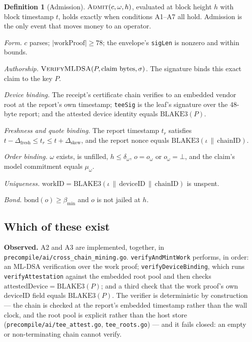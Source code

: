 \documentclass[11pt,a4paper]{article}
\theoremstyle{definition}
\newtheorem{definition}{Definition}[section]
\theoremstyle{remark}
\newcommand{\code}[1]{\texttt{#1}}
\newcommand{\Ord}{\omega}
\newcommand{\Claim}{c}
\newcommand{\Admit}{\textsc{Admit}}
\begin{document}
\begin{definition}[Admission]
$\Admit(\Claim, \Ord, h)$, evaluated at block height $h$ with block timestamp
$t$, holds exactly when conditions A1--A7 all hold. Admission is the only
event that moves money to an operator.
\end{definition}

\begin{description}[leftmargin=2.6em,style=sameline,labelwidth=2.2em]
\item[A1] \emph{Form.} $\Claim$ parses; $|\text{workProof}| \ge 78$; the
envelope's \code{sigLen} is nonzero and within bounds.
\item[A2] \emph{Authorship.} $\textsc{VerifyMLDSA}(P, \text{claim bytes}, \sigma)$.
The signature binds this exact claim to the key $P$.
\item[A3] \emph{Device binding.} The receipt's certificate chain verifies to an
embedded vendor root at the report's own timestamp; \code{teeSig} is the leaf's
signature over the 48-byte report; and the attested device identity equals
$\mathrm{BLAKE3}(P)$.
\item[A4] \emph{Freshness and quote binding.} The report timestamp $t_r$
satisfies $t - \Delta_{\text{fresh}} \le t_r \le t + \Delta_{\text{skew}}$, and
the report nonce equals $\mathrm{BLAKE3}(\iota \,\|\, \text{chainID})$.
\item[A5] \emph{Order binding.} $\Ord$ exists, is unfilled, $h \le \delta_\Ord$,
$o = o_\Ord$ or $o_\Ord = \bot$, and the claim's model commitment equals
$\mu_\Ord$.
\item[A6] \emph{Uniqueness.} $\mathrm{workID} = \mathrm{BLAKE3}(\iota \,\|\,
\mathrm{deviceID} \,\|\, \text{chainID})$ is unspent.
\item[A7] \emph{Bond.} $\mathrm{bond}(o) \ge \beta_{\min}$ and $o$ is not jailed
at $h$.
\end{description}

\subsection{Which of these exist}

\textbf{Observed.} A2 and A3 are implemented, together, in
\code{precompile/ai/cross\_chain\_mining.go}. \code{verifyAndMintWork} performs,
in order: an ML-DSA verification over the work proof; \code{verifyDeviceBinding},
which runs \code{verifyAttestation} against the embedded root pool and then
checks $\text{attestedDevice} = \mathrm{BLAKE3}(P)$; and a third check that the
work proof's own deviceID field equals $\mathrm{BLAKE3}(P)$. The verifier is
deterministic by construction --- the chain is checked at the report's embedded
timestamp rather than the wall clock, and the root pool is explicit rather than
the host store (\code{precompile/ai/tee\_attest.go}, \code{tee\_roots.go}) ---
and it fails closed: an empty or non-terminating chain cannot verify.
\end{document}
